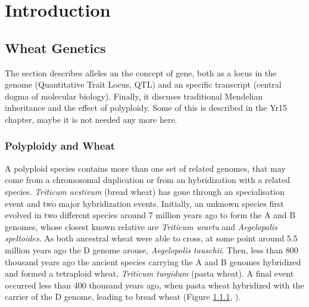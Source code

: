 

\chapter{Introduction}



\section{Wheat Genetics}
The section describes alleles an the concept of gene, both as a locus in the genome (Quantitative Trait Locus, QTL) and an specific transcript (central dogma of molecular biology). Finally, it discuses traditional Mendelian inheritance and the effect of polyploidy.  Some of this is described in the Yr15 chapter, maybe it is not needed any more here. 


\subsection{Polyploidy and Wheat}
\label{lit:polyploidy}

A polyploid species contains more than one set of related genomes, that may come from a chromosomal duplication or from an hybridization with a related species. 
\textit{Triticum aestivum} (bread wheat) has gone through an specialisation event and two major hybridization events. 
Initially, an unknown species first evolved in two different species around 7 million years ago to form the A and B genomes, whose closest known relative are \textit{Triticum urartu} and \textit{Aegelopolis speltoides}. 
As both ancestral wheat were able to cross, at some point around 5.5 million years ago the D genome arouse, \textit{Aegelopolis tauschii}. 
Then, less than 800 thousand years ago the ancient species carrying the  A and B genomes hybridized and formed a tetraploid wheat, \textit{Triticum turgidum} (pasta wheat). 
A final event occurred less than 400 thousand years ago, when pasta wheat hybridized with the carrier of the D genome, leading to bread wheat (Figure \ref{lit:polyploidy}, \citealt{Marcussen2014}).  

